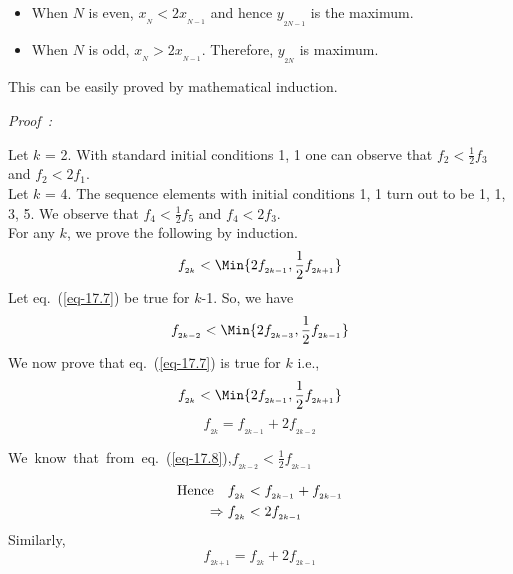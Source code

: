 \begin{multicols}{2}
\vspace{-.6cm}

\begin{itemize}
 \setlength{\parskip}{-1pt}
\item When $N$ is even, $x_{_N} < 2x_{_{N-1}}$ and hence $y_{_{2N-1}}$ is the maximum.\\[-.5cm]
\item When $N$ is odd, $x_{_N} > 2x_{_{N-1}}$. Therefore, $y_{_{2N}}$ is maximum.
\end{itemize}

\vspace{-.3cm}

This can be easily proved by mathematical induction.
 
{\it Proof~:}

Let $k$ = 2. With standard initial conditions 1, 1 one can observe that $f_2 < \frac{1}{2}f_3$ and $f_2 < 2f_1$.\\
Let $k$ = 4. The sequence elements with initial conditions 1, 1 turn out to be 1, 1, 3, 5. We observe that $f_4 < \frac{1}{2}f_5$ and $f_4 < 2f_3$. \\
For any $k$, we prove the following by induction. 
\begin{equation}
f_{_{2k}} < \Min\{2f_{_{2k-1}}, \frac{1}{2}f_{_{2k+1}}\}\label{eq-17.7}
\end{equation}
Let eq.~(\ref{eq-17.7}) be true for $k$-1. So, we have
\begin{equation}
f_{_{2k-2}} < \Min\{2f_{_{2k-3}}, \frac{1}{2}f_{_{2k-1}}\}\label{eq-17.8}
\end{equation}
We now prove that eq.~(\ref{eq-17.7}) is true for $k$ i.e.,
\begin{equation}\nonumber
f_{_{2k}} < \Min\{2f_{_{2k-1}}, \frac{1}{2}f_{_{2k+1}}\}
\end{equation}
\begin{equation}
f_{_{2k}} = f_{_{2k-1}} + 2f_{_{2k-2}}\label{eq-17.9}
\end{equation}

\textup{We~know~that~from~eq.~(\ref{eq-17.8})},\quad $f_{_{2k-2}} < \frac{1}{2}f_{_{2k-1}}$ 

\vspace{-.6cm}

\begin{align}
\textup{Hence}\quad f_{_{2k}} &< f_{_{2k-1}} + f_{_{2k-1}}\nonumber\\
\Rightarrow  f_{_{2k}} &< 2f_{_{2k-1}}\label{eq-17.10}
\end{align}
Similarly,
\begin{equation}
f_{_{2k+1}} = f_{_{2k}} + 2f_{_{2k-1}}\label{eq-17.11}
\end{equation}


\end{multicols}
